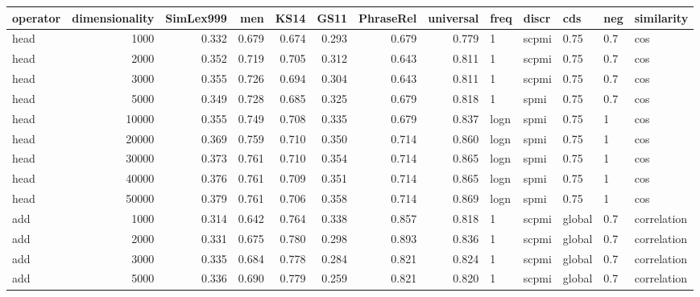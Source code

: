 \begin{tabular}{lrrrrrrrlllll}
\toprule
operator &  dimensionality &  SimLex999 &    men &   KS14 &   GS11 &  PhraseRel &  universal &  freq &  discr &     cds &  neg &     similarity \\
\midrule
    head &            1000 &      0.332 &  0.679 &  0.674 &  0.293 &      0.679 &      0.779 &     1 &  scpmi &    0.75 &  0.7 &            cos \\
    head &            2000 &      0.352 &  0.719 &  0.705 &  0.312 &      0.643 &      0.811 &     1 &  scpmi &    0.75 &  0.7 &            cos \\
    head &            3000 &      0.355 &  0.726 &  0.694 &  0.304 &      0.643 &      0.811 &     1 &  scpmi &    0.75 &  0.7 &            cos \\
    head &            5000 &      0.349 &  0.728 &  0.685 &  0.325 &      0.679 &      0.818 &     1 &   spmi &    0.75 &  0.7 &            cos \\
    head &           10000 &      0.355 &  0.749 &  0.708 &  0.335 &      0.679 &      0.837 &  logn &   spmi &    0.75 &    1 &            cos \\
    head &           20000 &      0.369 &  0.759 &  0.710 &  0.350 &      0.714 &      0.860 &  logn &   spmi &    0.75 &    1 &            cos \\
    head &           30000 &      0.373 &  0.761 &  0.710 &  0.354 &      0.714 &      0.865 &  logn &   spmi &    0.75 &    1 &            cos \\
    head &           40000 &      0.376 &  0.761 &  0.709 &  0.351 &      0.714 &      0.865 &  logn &   spmi &    0.75 &    1 &            cos \\
    head &           50000 &      0.379 &  0.761 &  0.706 &  0.358 &      0.714 &      0.869 &  logn &   spmi &    0.75 &    1 &            cos \\
     add &            1000 &      0.314 &  0.642 &  0.764 &  0.338 &      0.857 &      0.818 &     1 &  scpmi &  global &  0.7 &    correlation \\
     add &            2000 &      0.331 &  0.675 &  0.780 &  0.298 &      0.893 &      0.836 &     1 &  scpmi &  global &  0.7 &    correlation \\
     add &            3000 &      0.335 &  0.684 &  0.778 &  0.284 &      0.821 &      0.824 &     1 &  scpmi &  global &  0.7 &    correlation \\
     add &            5000 &      0.336 &  0.690 &  0.779 &  0.259 &      0.821 &      0.820 &     1 &  scpmi &  global &  0.7 &    correlation \\

\end{tabular}
